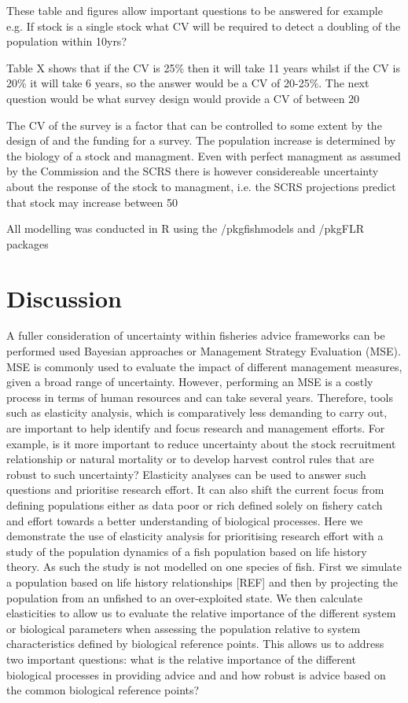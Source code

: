 \documentclass[preprint,authoryear,12pt]{elsarticle}
\begin{document}
These table and figures allow important questions to be answered for example e.g.
If stock is a single stock what CV will be required to detect a doubling of the population within 10yrs?

Table X shows that if the CV is 25\% then it will take 11 years whilst if the CV is 20\% it will take 6 years, so the answer would be a CV of 20-25\%. The next question would be what survey design would provide a CV of between 20%

The CV of the survey is a factor that can be controlled to some extent by the design of and the funding for a survey. The population increase is determined by the biology of a stock and managment. Even with perfect managment as assumed by the Commission and the SCRS there is however considereable uncertainty about the response of the stock to managment, i.e. the SCRS projections predict that stock may increase between 50%


All modelling was conducted in R using the /pkg{fishmodels} and /pkg{FLR} packages

\section{Discussion}	
A fuller consideration of uncertainty within fisheries advice frameworks can be
performed used Bayesian approaches or Management Strategy Evaluation (MSE). MSE is
commonly used to evaluate the impact of different management measures, given a broad
range of uncertainty. However, performing an MSE is a costly process in terms of human
resources and can take several years. Therefore, tools such as elasticity analysis,
which is comparatively less demanding to carry out, are important to help identify
and focus research and management efforts. For example, is it more important to
reduce uncertainty about the stock recruitment relationship or natural mortality
or to develop harvest control rules that are robust to such uncertainty? Elasticity
analyses can be used to answer such questions and prioritise research effort. It
can also shift the current focus from defining populations either as data poor or
rich defined solely on fishery catch and effort towards a better understanding of
biological processes. Here we demonstrate the use of elasticity analysis for
prioritising research effort with a study of the population dynamics of a fish population
based on life history theory. As such the study is not modelled on one species of
fish. First we simulate a population based on life history relationships [REF] and
then by projecting the population from an unfished to an over-exploited state.
We then calculate elasticities to allow us to evaluate the relative importance of
the different system or biological parameters when assessing the population relative
to system characteristics defined by biological reference points. This allows us
to address two important questions: what is the relative importance of the different
biological processes in providing advice and and how robust is advice based on the
common biological reference points?
\end{document}
